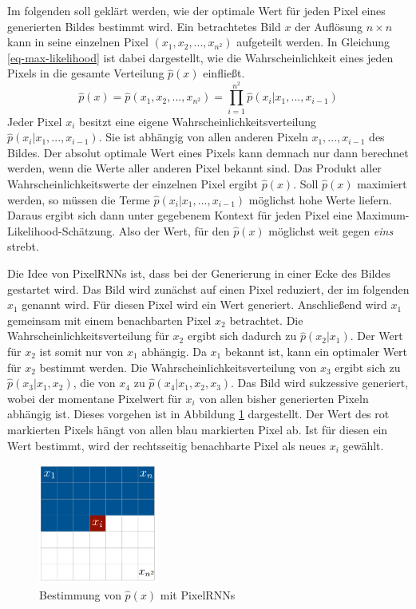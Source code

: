 Im folgenden soll geklärt werden, wie der optimale Wert für jeden Pixel eines generierten Bildes bestimmt wird. Ein betrachtetes Bild $x$ der Auflösung $n \times n$ kann in seine einzelnen Pixel $(x_{1}, x_{2}, ..., x_{n^2})$ aufgeteilt werden. In Gleichung \ref{eq-max-likelihood} ist dabei dargestellt, wie die Wahrscheinlichkeit eines jeden Pixels in die gesamte Verteilung $\hat{p}(x)$ einfließt. \cite{pixelRNN}
\begin{equation}
   \label{eq-max-likelihood}
   \hat{p}(x) = \hat{p}(x_{1}, x_{2}, ..., x_{n^2}) = \prod_{i=1}^{n^2}\hat{p}(x_{i}|x_{1},...,x_{i-1})
\end{equation}
Jeder Pixel $x_{i}$ besitzt eine eigene Wahrscheinlichkeitsverteilung $\hat{p}(x_{i}|x_{1},...,x_{i-1})$. Sie ist abhängig von allen anderen Pixeln $x_{1},...,x_{i-1}$ des Bildes. Der absolut optimale Wert eines Pixels kann demnach nur dann berechnet werden, wenn die Werte aller anderen Pixel bekannt sind. Das Produkt aller Wahrscheinlichkeitswerte der einzelnen Pixel ergibt $\hat{p}(x)$. Soll $\hat{p}(x)$ maximiert werden, so müssen die Terme $\hat{p}(x_{i}|x_{1},...,x_{i-1})$ möglichst hohe Werte liefern. Daraus ergibt sich dann unter gegebenem Kontext für jeden Pixel eine Maximum-Likelihood-Schätzung. Also der Wert, für den $\hat{p}(x)$ möglichst weit gegen \emph{eins} strebt. \cite{pixelRNN}

Die Idee von PixelRNNs ist, dass bei der Generierung in einer Ecke des Bildes gestartet wird. Das Bild wird zunächst auf einen Pixel reduziert, der im folgenden $x_{1}$ genannt wird. Für diesen Pixel wird ein Wert generiert. Anschließend wird $x_{1}$ gemeinsam mit einem benachbarten Pixel $x_{2}$ betrachtet. Die Wahrscheinlichkeitsverteilung für $x_{2}$ ergibt sich dadurch zu $\hat{p}(x_{2}|x_{1})$. Der Wert für $x_2$ ist somit nur von $x_1$ abhängig. Da $x_{1}$ bekannt ist, kann ein optimaler Wert für $x_{2}$ bestimmt werden. Die Wahrscheinlichkeitsverteilung von $x_{3}$ ergibt sich zu $\hat{p}(x_{3}|x_{1}, x_{2})$, die von $x_{4}$ zu $\hat{p}(x_{4}|x_{1}, x_{2}, x_{3})$. Das Bild wird sukzessive generiert, wobei der momentane Pixelwert für $x_{i}$ von allen bisher generierten Pixeln abhängig ist. Dieses vorgehen ist in Abbildung \ref{fig:pixelRNN} dargestellt. Der Wert des rot markierten Pixels hängt von allen blau markierten Pixel ab. Ist für diesen ein Wert bestimmt, wird der rechtsseitig benachbarte Pixel als neues $x_{i}$ gewählt.

\begin{figure}[H]
   \centering
   \includegraphics[width=0.35\textwidth]{images/Generative Networks/PixelRNN.png}
   \caption{Bestimmung von $\hat{p}(x)$ mit PixelRNNs \cite{pixelRNN}}
   \label{fig:pixelRNN}
\end{figure}

